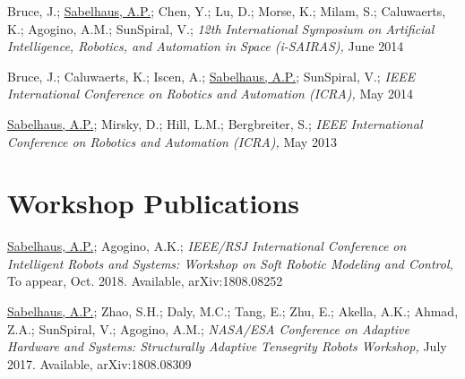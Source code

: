 \documentclass[letterpaper]{deedy-resume} %
\begin{document}
\begin{etaremune}
\item {} Bruce, J.; \underline{Sabelhaus, A.P.}; Chen, Y.; Lu, D.; Morse, K.; Milam, S.; Caluwaerts, K.; Agogino, A.M.; SunSpiral, V.; {\it 12th International Symposium on Artificial Intelligence, Robotics, and Automation in Space (i-SAIRAS),} June 2014

\item {} Bruce, J.; Caluwaerts, K.; Iscen, A.; \underline{Sabelhaus, A.P.}; SunSpiral, V.; {\it IEEE International Conference on Robotics and Automation (ICRA),} May 2014

\item {} \underline{Sabelhaus, A.P.}; Mirsky, D.; Hill, L.M.; Bergbreiter, S.; {\it IEEE International Conference on Robotics and Automation (ICRA),} May 2013


\end{etaremune}








\section{Workshop Publications}

\begin{etaremune}

\item {} \underline{Sabelhaus, A.P.}; Agogino, A.K.; {\it IEEE/RSJ International Conference on Intelligent Robots and Systems: Workshop on Soft Robotic Modeling and Control,} To appear, Oct. 2018. Available, arXiv:1808.08252

\item {} \underline{Sabelhaus, A.P.}; Zhao, S.H.; Daly, M.C.; Tang, E.; Zhu, E.; Akella, A.K.; Ahmad, Z.A.; SunSpiral, V.; Agogino, A.M.; {\it NASA/ESA Conference on Adaptive Hardware and Systems: Structurally Adaptive Tensegrity Robots Workshop,} July 2017. Available, arXiv:1808.08309
  
\end{etaremune}
\end{document}
